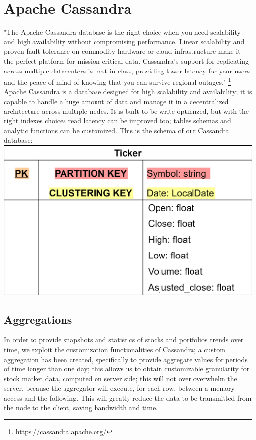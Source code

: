 \section{Apache Cassandra}
"The Apache Cassandra database is the right choice when you need scalability and high 
availability without compromising performance. Linear scalability and proven fault-tolerance 
on commodity hardware or cloud infrastructure make it the perfect platform for mission-critical 
data. Cassandra's support for replicating across multiple datacenters is best-in-class, 
providing lower latency for your users and the peace of mind of knowing that you can survive
regional outages." \footnote{https://cassandra.apache.org/}\\
Apache Cassandra is a database designed for high scalability and availability; it is 
capable to handle a huge amount of data and manage it in a decentralized architecture
across multiple nodes. It is built to be write optimized, but with the right indexes choices
read latency can be improved too; tables schemas and analytic functions can be customized.
This is the schema of our Cassandra database:\\
\includegraphics[scale=0.2]{img/cassandraDB_scheme.png}\\
\subsection{Aggregations}
In order to provide snapshots and statistics of stocks and portfolios trends over time,
we exploit the customization functionalities of Cassandra; a custom aggregation has been 
created, specifically to provide aggregate values for periods of time longer than one day; this allows us to obtain customizable granularity for stock market data,
computed on server side; this will not over overwhelm the server, because the aggregator will
execute, for each row, between a memory access and the following. This will greatly reduce
the data to be transmitted from the node to the client, saving bandwidth and time.  \\

